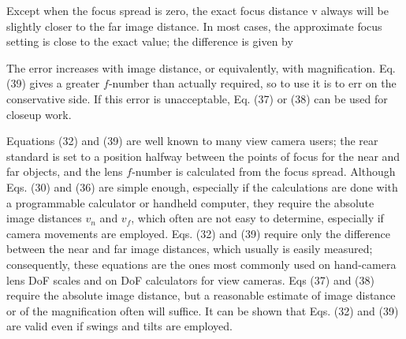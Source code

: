 \documentclass[11pt, oneside]{scrartcl}   	%
\begin{document}
Except when the focus spread is zero, the exact focus distance v always will be slightly closer to the far image distance. In most cases, the approximate focus setting is close to the exact value; the difference is given by

The error increases with image distance, or equivalently, with magnification. Eq. (39) gives a greater $f$-number than actually required, so to use it is to err on the conservative side. If this error is unacceptable, Eq. (37) or (38) can be used for closeup work.

Equations (32) and (39) are well known to many view camera users; the rear standard is set to a position halfway between the points of focus for the near and far objects, and the lens $f$-number is calculated from the focus spread. Although Eqs. (30) and (36) are simple enough, especially if the calculations are done with a programmable calculator or handheld computer, they require the absolute image distances $v_n$ and $v_f$, which often are not easy to determine, especially if camera movements are employed. Eqs. (32) and (39) require only the difference between the near and far image distances, which usually is easily measured; consequently, these equations are the ones most commonly used on hand-camera lens DoF scales and on DoF calculators for view cameras. Eqs (37) and (38) require the absolute image distance, but a reasonable estimate of image distance or of the magnification often will suffice. It can be shown that Eqs. (32) and (39) are valid even if swings and tilts are employed.
\end{document}
